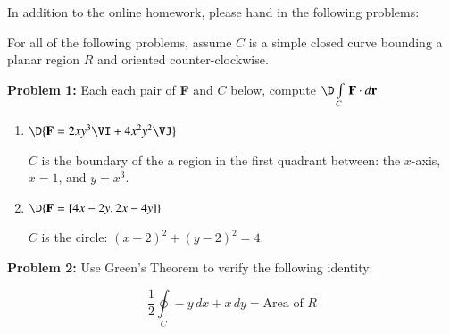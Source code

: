 \documentclass[11pt]{article}
\begin{document}


In addition to the online homework, please hand in the following problems:

\vspace{0.2cm}

For all of the following problems, assume $C$ is a simple closed curve bounding a planar region $R$ and oriented counter-clockwise.

\vspace{0.2cm}

{\bf Problem 1:} Each each pair of {\bf F} and $C$ below, compute $\D \int \limits_{C} \, {\bf F} \cdot d{\bf r}$

\begin{enumerate}
	\item[a.] $\D{{\bf F} = 2xy^3\VI + 4x^2y^2\VJ}$
	
	\vspace{0.01cm}
	$C$ is the boundary of the a region in the first quadrant between: the $x$-axis, \,$x=1$, and $y=x^3$.
	
	\vspace{0.2cm}
	\item[b.] $\D{{\bf F} = [4x-2y,2x-4y]}$ 
	
	\vspace{0.01cm}
	$C$ is the circle: $(x-2)^2 + (y-2)^2 = 4$.

\end{enumerate}

\vspace{0.4cm}

{\bf Problem 2:} Use Green's Theorem to verify the following identity:

$$
\frac{1}{2}\oint \limits_{C} -y \, dx + x \, dy = \text{Area of $R$}
$$ 

\vspace{0.4cm}

%  
%

%
%

		
\end{document}
